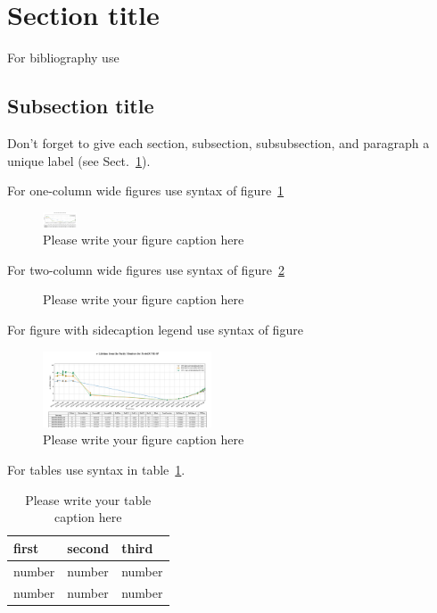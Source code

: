 \documentclass{webofc}
\begin{document}
\section{Section title}
\label{sec-1}
For bibliography use \cite{RefJ}
\subsection{Subsection title}
\label{sec-2}
Don't forget to give each section, subsection, subsubsection, and
paragraph a unique label (see Sect.~\ref{sec-1}).

For one-column wide figures use syntax of figure~\ref{fig-1}
\begin{figure}[h]
\centering
\includegraphics[width=1cm,clip]{figures/dqm_purmon_20190910_1.png}
\caption{Please write your figure caption here}
\label{fig-1}       %
\end{figure}

For two-column wide figures use syntax of figure~\ref{fig-2}
\begin{figure}
\centering
\vspace*{5cm}       %
\caption{Please write your figure caption here}
\label{fig-2}       %
\end{figure}

For figure with sidecaption legend use syntax of figure
\begin{figure}
\centering
\sidecaption
\includegraphics[width=5cm,clip]{figures/dqm_purmon_20190910_1.png}
\caption{Please write your figure caption here}
\label{fig-3}       %
\end{figure}

For tables use syntax in table~\ref{tab-1}.
\begin{table}
\centering
\caption{Please write your table caption here}
\label{tab-1}       %
\begin{tabular}{lll}
\hline
first & second & third  \\\hline
number & number & number \\
number & number & number \\\hline
\end{tabular}
\vspace*{5cm}  %
\end{table}
\end{document}
